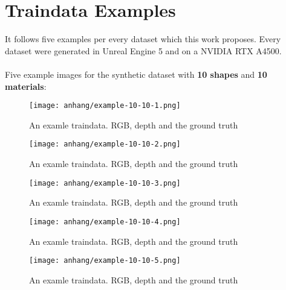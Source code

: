 \chapter{Traindata Examples}
\label{appendix:traindata-examples}

	It follows five examples per every dataset which this work proposes. Every dataset were generated in Unreal Engine 5 \cite{ue5} and on a NVIDIA RTX A4500.\\
	\\
	Five example images for the synthetic dataset with \textbf{10 shapes} and \textbf{10 materials}:
	\begin{figure}[H]
		\centering
		\texttt{[image: anhang/example-10-10-1.png]}
		\caption[An examle traindata. RGB, depth and the ground truth]{An examle traindata. RGB, depth and the ground truth}
	\end{figure}
	\begin{figure}[H]
		\centering
		\texttt{[image: anhang/example-10-10-2.png]}
		\caption[An examle traindata. RGB, depth and the ground truth]{An examle traindata. RGB, depth and the ground truth}
	\end{figure}
	\begin{figure}[H]
		\centering
		\texttt{[image: anhang/example-10-10-3.png]}
		\caption[An examle traindata. RGB, depth and the ground truth]{An examle traindata. RGB, depth and the ground truth}
	\end{figure}
	\begin{figure}[H]
		\centering
		\texttt{[image: anhang/example-10-10-4.png]}
		\caption[An examle traindata. RGB, depth and the ground truth]{An examle traindata. RGB, depth and the ground truth}
	\end{figure}
	\begin{figure}[H]
		\centering
		\texttt{[image: anhang/example-10-10-5.png]}
		\caption[An examle traindata. RGB, depth and the ground truth]{An examle traindata. RGB, depth and the ground truth}
	\end{figure}
	
